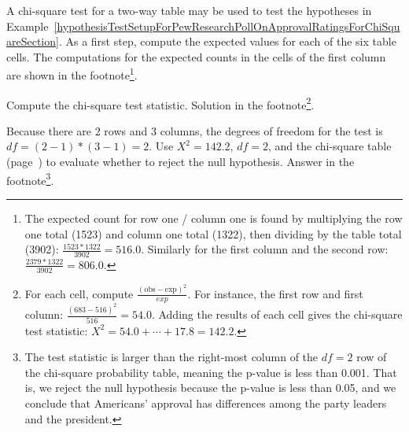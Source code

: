 \begin{exercise}
A chi-square test for a two-way table may be used to test the hypotheses in Example~\ref{hypothesisTestSetupForPewResearchPollOnApprovalRatingsForChiSquareSection}. As a first step, compute the expected values for each of the six table cells. The computations for the expected counts in the cells of the first column are shown in the footnote\footnote{The expected count for row one / column one is found by multiplying the row one total (1523) and column one total (1322), then dividing by the table total (3902): $\frac{1523*1322}{3902} = 516.0$. Similarly for the first column and the second row: $\frac{2379*1322}{3902} = 806.0$.}.
\end{exercise}

\begin{exercise}
Compute the chi-square test statistic. Solution in the footnote\footnote{For each cell, compute $\frac{(\text{obs} - \text{exp})^2}{exp}$. For instance, the first row and first column: $\frac{(683-516)^2}{516} = 54.0$. Adding the results of each cell gives the chi-square test statistic: {\scriptsize$X^2 = 54.0 + \cdots + 17.8 = 142.2$}.}.
\end{exercise}

\begin{exercise}
Because there are 2 rows and 3 columns, the degrees of freedom for the test is $df=(2-1)*(3-1) = 2$. Use $X^2=142.2$, $df=2$, and the chi-square table (page~\pageref{chiSquareProbabilityTable}) to evaluate whether to reject the null hypothesis. Answer in the footnote\footnote{The test statistic is larger than the right-most column of the $df=2$ row of the chi-square probability table, meaning the p-value is less than 0.001. That is, we reject the null hypothesis because the p-value is less than 0.05, and we conclude that Americans' approval has differences among the party leaders and the president.}.
\end{exercise}


